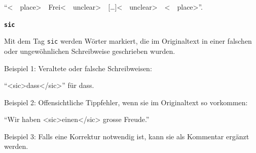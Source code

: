 \documentclass[12pt, a4paper, ngerman, bidi=default]{article}
\begin{document}
\begin{description}
    \colorbox{VeryLightGray}{\enquote{{\textless\ \  place\textgreater\ \  Frei\textless\ \  unclear\textgreater\ \  [\ldots]\textless\ \  unclear\textgreater\ \  \textless\ \  place\textgreater}}.}
    
    \item\texttt{\textbf{{\colorbox{sic}{sic}}}} 

    Mit dem Tag \texttt{sic} werden Wörter markiert, die im Originaltext in einer falschen oder ungewöhnlichen Schreibweise geschrieben wurden. 
    
    \noindent{} Beispiel 1: Veraltete oder falsche Schreibweisen: 

    \colorbox{VeryLightGray}{\enquote{{<sic>dass</sic>}} für dass.}

     Beispiel 2: Offensichtliche Tippfehler, wenn sie im Originaltext so vorkommen: 

    \colorbox{VeryLightGray}{\enquote{Wir haben {<sic>einen</sic>} grosse Freude.}}

     Beispiel 3: Falls eine Korrektur notwendig ist, kann sie als Kommentar ergänzt werden. 

    \end{description}
\end{document}
